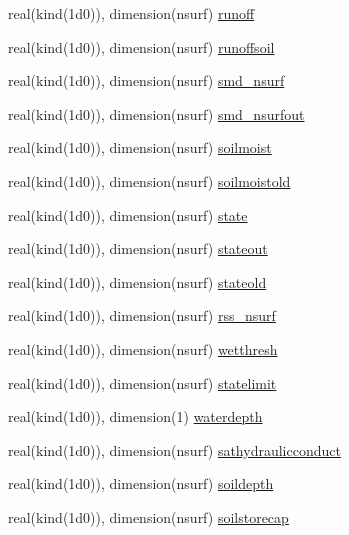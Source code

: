 \begin{DoxyCompactItemize}
\item 
real(kind(1d0)), dimension(nsurf) \hyperlink{namespaceallocatearray_abf84199761d02e1a9304d1d7a2c00eba}{runoff}
\item 
real(kind(1d0)), dimension(nsurf) \hyperlink{namespaceallocatearray_a56dec28d9173b960574b82696b82f7a2}{runoffsoil}
\item 
real(kind(1d0)), dimension(nsurf) \hyperlink{namespaceallocatearray_a1dcc99b13956867bdc2a58c234193a2e}{smd\+\_\+nsurf}
\item 
real(kind(1d0)), dimension(nsurf) \hyperlink{namespaceallocatearray_a332b5e58530f77936db6b394822768c9}{smd\+\_\+nsurfout}
\item 
real(kind(1d0)), dimension(nsurf) \hyperlink{namespaceallocatearray_ae688a4f5497c961baf9c8eecae674ec4}{soilmoist}
\item 
real(kind(1d0)), dimension(nsurf) \hyperlink{namespaceallocatearray_a21359b000cf1cea64f86412e4336b957}{soilmoistold}
\item 
real(kind(1d0)), dimension(nsurf) \hyperlink{namespaceallocatearray_a1573a7ac84781a2f33ba27e9b4fd7fc4}{state}
\item 
real(kind(1d0)), dimension(nsurf) \hyperlink{namespaceallocatearray_ac4a521fdb896dece1a1412de6892e77c}{stateout}
\item 
real(kind(1d0)), dimension(nsurf) \hyperlink{namespaceallocatearray_a417b9ff3eb6479963b494b8c50d661c2}{stateold}
\item 
real(kind(1d0)), dimension(nsurf) \hyperlink{namespaceallocatearray_ac0727c70a30d09ad8597e7b6456b619f}{rss\+\_\+nsurf}
\item 
real(kind(1d0)), dimension(nsurf) \hyperlink{namespaceallocatearray_ade77725040669c18c67ee2a4891b2711}{wetthresh}
\item 
real(kind(1d0)), dimension(nsurf) \hyperlink{namespaceallocatearray_a66a859de2b0cea378b18814cdb0438ba}{statelimit}
\item 
real(kind(1d0)), dimension(1) \hyperlink{namespaceallocatearray_a1b3be466e275395a0ce613feb29c678d}{waterdepth}
\item 
real(kind(1d0)), dimension(nsurf) \hyperlink{namespaceallocatearray_a7a8427e580d0969440e13673f28c5104}{sathydraulicconduct}
\item 
real(kind(1d0)), dimension(nsurf) \hyperlink{namespaceallocatearray_a243033c7c16c825a30417c6bd4ea9f4e}{soildepth}
\item 
real(kind(1d0)), dimension(nsurf) \hyperlink{namespaceallocatearray_a1c0a391fbf8e63a46d93cae2c6c11049}{soilstorecap}

\end{DoxyCompactItemize}
